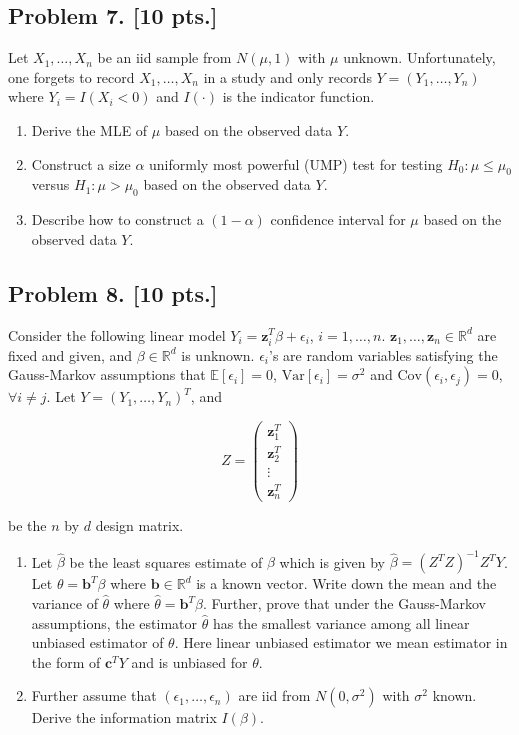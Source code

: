 \documentclass[11pt,a4paper]{article}
\begin{document}
\subsection{Problem 7. [10 pts.]}
Let \( X_1, \dots, X_n \) be an iid sample from \( N(\mu, 1) \) with \( \mu \) unknown. Unfortunately, one forgets to record \( X_1, \dots, X_n \) in a study and only records \( Y = (Y_1, \dots, Y_n) \) where \( Y_i = I(X_i < 0) \) and \( I(\cdot) \) is the indicator function.
\begin{enumerate}[label=(\alph*)]
    \item Derive the MLE of \( \mu \) based on the observed data \( Y \).
    \item Construct a size \( \alpha \) uniformly most powerful (UMP) test for testing \( H_0 : \mu \le \mu_0 \) versus \( H_1 : \mu > \mu_0 \) based on the observed data \( Y \).
    \item Describe how to construct a \( (1 - \alpha) \) confidence interval for \( \mu \) based on the observed data \( Y \).
\end{enumerate}

\subsection{Problem 8. [10 pts.]}
Consider the following linear model \( Y_i = \mathbf{z}_i^T \beta + \epsilon_i \), \( i = 1, \dots, n \). \( \mathbf{z}_1, \dots, \mathbf{z}_n \in \mathbb{R}^d \) are fixed and given, and \( \beta \in \mathbb{R}^d \) is unknown. \( \epsilon_i \)'s are random variables satisfying the Gauss-Markov assumptions that \( \mathbb{E}[\epsilon_i] = 0 \), \( \mathrm{Var}[\epsilon_i] = \sigma^2 \) and \( \mathrm{Cov}(\epsilon_i, \epsilon_j) = 0 \), \( \forall i \neq j \). Let \( Y = (Y_1, \dots, Y_n)^T \), and

\[
Z =
\begin{pmatrix}
\mathbf{z}_1^T \\
\mathbf{z}_2^T \\
\vdots \\
\mathbf{z}_n^T
\end{pmatrix}
\]

be the \( n \) by \( d \) design matrix.
\begin{enumerate}[label=(\alph*)]
    \item Let \( \hat{\beta} \) be the least squares estimate of \( \beta \) which is given by \( \hat{\beta} = (Z^T Z)^{-1} Z^T Y \). Let \( \theta = \mathbf{b}^T \beta \) where \( \mathbf{b} \in \mathbb{R}^d \) is a known vector. Write down the mean and the variance of \( \hat{\theta} \) where \( \hat{\theta} = \mathbf{b}^T \hat{\beta} \). Further, prove that under the Gauss-Markov assumptions, the estimator \( \hat{\theta} \) has the smallest variance among all linear unbiased estimator of \( \theta \). Here linear unbiased estimator we mean estimator in the form of \( \mathbf{c}^T Y \) and is unbiased for \( \theta \).
    \item Further assume that \( (\epsilon_1, \dots, \epsilon_n) \) are iid from \( N(0, \sigma^2) \) with \( \sigma^2 \) known. Derive the information matrix \( I(\beta) \).
\end{enumerate}
\end{document}
